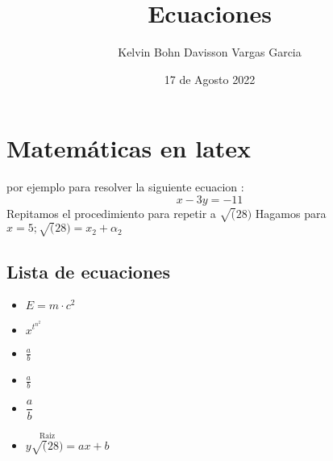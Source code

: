 \documentclass{article}
\title{Ecuaciones}
\author{Kelvin Bohn Davisson Vargas Garcia }
\date{17 de Agosto 2022}
\begin{document}
\maketitle
\section{Matemáticas en latex}
por ejemplo para resolver la siguiente ecuacion : $$x-3y=-11$$
Repitamos el procedimiento para repetir a $\sqrt(28)$ Hagamos para $x=5;\sqrt(28)=x_{2}+\alpha_{2}$
\subsection{Lista de ecuaciones}
\begin{itemize}
\item $E=m\cdot c^2$
\item $x^{t^{n^{2}}}$
\item $\frac{a}{b}$
\item $\displaystyle\frac{a}{b}$
\item $\dfrac{a}{b}$
\item $y\overset{\text{Raiz}}{\sqrt(28)}={ax+b}$
\end{itemize}
\end{document}
